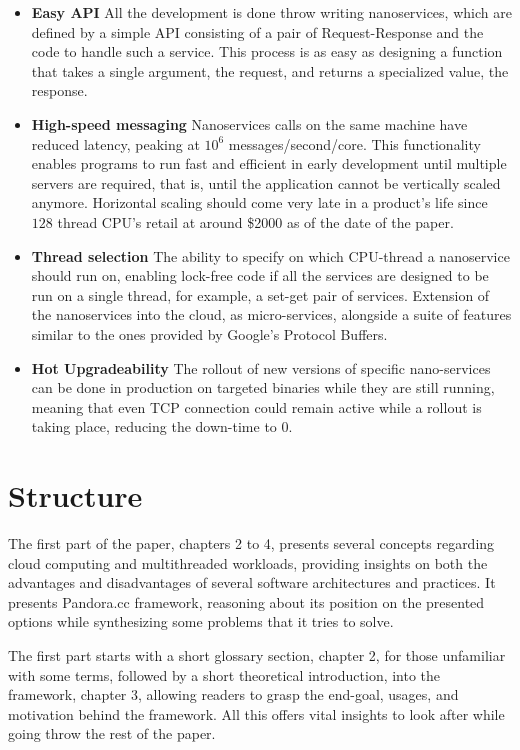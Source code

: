 \begin{itemize}
\item \textbf{Easy API} All the development is done throw writing nanoservices, which are defined by a simple API consisting of a pair of Request-Response and the code to handle such a service. This process is as easy as designing a function that takes a single argument, the request, and returns a specialized value, the response.
\item \textbf{High-speed messaging} Nanoservices calls on the same machine have reduced latency, peaking at $10^6$ messages/second/core. This functionality enables programs to run fast and efficient in early development until multiple servers are required, that is, until the application cannot be vertically scaled anymore. Horizontal scaling should come very late in a product's life since $128$ thread CPU's retail at around \$2000 as of the date of the paper.
\item \textbf{Thread selection} The ability to specify on which CPU-thread a nanoservice should run on, enabling lock-free code if all the services are designed to be run on a single thread, for example, a set-get pair of services.
 Extension of the nanoservices into the cloud, as micro-services, alongside a suite of features similar to the ones provided by Google's Protocol Buffers.
\item \textbf{Hot Upgradeability} The rollout of new versions of specific nano-services can be done in production on targeted binaries while they are still running, meaning that even TCP connection could remain active while a rollout is taking place, reducing the down-time to 0.
\end{itemize}

\section{Structure}
The first part of the paper, chapters 2 to 4, presents several concepts regarding cloud computing and multithreaded workloads, providing insights on both the advantages and disadvantages of several software architectures and practices. It presents Pandora.cc framework, reasoning about its position on the presented options while synthesizing some problems that it tries to solve. 

The first part starts with a short glossary section, chapter 2, for those unfamiliar with some terms, followed by a short theoretical introduction, into the framework, chapter 3, allowing readers to grasp the end-goal, usages, and motivation behind the framework. All this offers vital insights to look after while going throw the rest of the paper.

